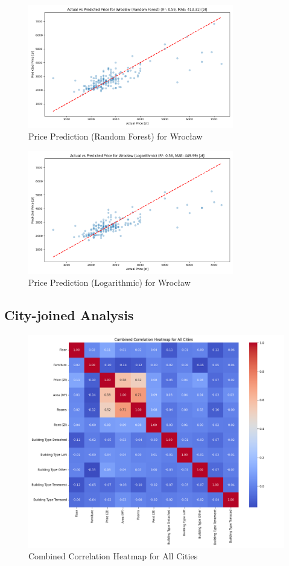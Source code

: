 \begin{figure}[H]
    \centering
    \includegraphics[width=0.8\textwidth]{figures/wroclaw_price_prediction_rf.png}
    \caption{Price Prediction (Random Forest) for Wrocław}
\end{figure}
\begin{figure}[H]
    \centering
    \includegraphics[width=0.8\textwidth]{figures/wroclaw_price_prediction_logarithmic.png}
    \caption{Price Prediction (Logarithmic) for Wrocław}
\end{figure}

\newpage

\subsection{City-joined Analysis}
\begin{figure}[H]
    \centering
    \includegraphics[width=0.8\linewidth]{figures/all_correlation_heatmap.png}
    \caption{Combined Correlation Heatmap for All Cities}
    \label{fig:all-correlation-heatmap}
\end{figure}

